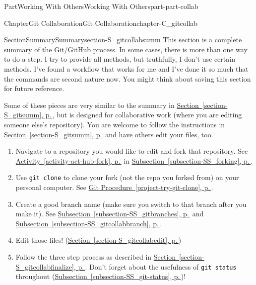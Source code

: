 \documentclass[twoside,10pt,]{book}
\newcommand{\xreffont}{\relax}
\newcommand{\mono}[1]{\texttt{#1}}
\begin{document}
\begin{partptx}{Part}{Working With Others}{}{Working With Others}{}{}{part-part-collab}
\begin{chapterptx}{Chapter}{Git Collaboration}{}{Git Collaboration}{}{}{chapter-C_gitcollab}
\typeout{************************************************}
%
\begin{sectionptx}{Section}{Summary}{}{Summary}{}{}{section-S_gitcollabsumm}
%
This section is a complete summary of the Git\slash{}GitHub process. In some cases, there is more than one way to do a step. I try to provide all methods, but truthfully, I don't use certain methods. I've found a workflow that works for me and I've done it so much that the commands are second nature now. You might think about saving this section for future reference.%
\par
Some of these pieces are very similar to the summary in \hyperref[section-S_gitsumm]{Section~{\xreffont\ref{section-S_gitsumm}}, p.\,\pageref{section-S_gitsumm}}, but is designed for collaborative work (where you are editing someone else's repository). You are welcome to follow the instructions in \hyperref[section-S_gitsumm]{Section~{\xreffont\ref{section-S_gitsumm}}, p.\,\pageref{section-S_gitsumm}} and have others edit your files, too.%
\begin{enumerate}
\item{}Navigate to a repository you would like to edit and fork that repository. See \hyperref[activity-act-hub-fork]{Activity~{\xreffont\ref{activity-act-hub-fork}}, p.\,\pageref{activity-act-hub-fork}} in \hyperref[subsection-SS_forking]{Subsection~{\xreffont\ref{subsection-SS_forking}}, p.\,\pageref{subsection-SS_forking}}.%
\item{}Use \mono{git clone} to clone your fork (not the repo you forked from) on your personal computer. See \hyperref[project-try-git-clone]{Git Procedure~{\xreffont\ref{project-try-git-clone}}, p.\,\pageref{project-try-git-clone}}.%
\item{}Create a good branch name (make sure you switch to that branch after you make it). See \hyperref[subsection-SS_gitbranches]{Subsection~{\xreffont\ref{subsection-SS_gitbranches}}, p.\,\pageref{subsection-SS_gitbranches}} and \hyperref[subsection-SS_gitcollabbranch]{Subsection~{\xreffont\ref{subsection-SS_gitcollabbranch}}, p.\,\pageref{subsection-SS_gitcollabbranch}}.%
\item{}Edit those files! (\hyperref[section-S_gitcollabedit]{Section~{\xreffont\ref{section-S_gitcollabedit}}, p.\,\pageref{section-S_gitcollabedit}})%
\item{}Follow the three step process as described in \hyperref[section-S_gitcollabfinalize]{Section~{\xreffont\ref{section-S_gitcollabfinalize}}, p.\,\pageref{section-S_gitcollabfinalize}}. Don't forget about the usefulness of \mono{git status} throughout (\hyperref[subsection-SS_git-status]{Subsection~{\xreffont\ref{subsection-SS_git-status}}, p.\,\pageref{subsection-SS_git-status}})!%

\end{enumerate}
\end{sectionptx}
\end{chapterptx}
\end{partptx}
\end{document}
